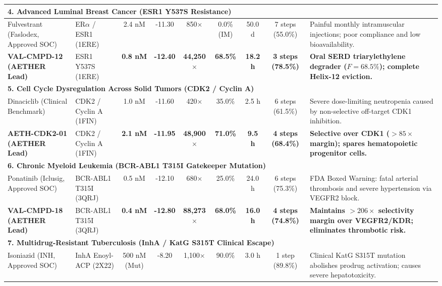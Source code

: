 \begin{table}[t]
{\begin{tabular}{lp{2.4cm}ccccccp{4.8cm}}
\hline
\multicolumn{9}{l}{\textbf{4. Advanced Luminal Breast Cancer (ESR1 Y537S Resistance)}} \\
\hline
Fulvestrant (Faslodex, Approved SOC) & ER$\alpha$ / ESR1 (1ERE) & 2.4 nM & -11.30 & 850$\times$ & 0.0\% (IM) & 50.0 d & 7 steps (55.0\%) & Painful monthly intramuscular injections; poor compliance and low bioavailability. \\
\textbf{VAL-CMPD-12 (AETHER Lead)} & ESR1 Y537S (1ERE) & \textbf{0.8 nM} & \textbf{-12.40} & \textbf{44,250$\times$} & \textbf{68.5\%} & \textbf{18.2 h} & \textbf{3 steps (78.5\%)} & \textbf{Oral SERD triarylethylene degrader ($F=68.5\%$); complete Helix-12 eviction.} \\
\hline
\multicolumn{9}{l}{\textbf{5. Cell Cycle Dysregulation Across Solid Tumors (CDK2 / Cyclin A)}} \\
\hline
Dinaciclib (Clinical Benchmark) & CDK2 / Cyclin A (1FIN) & 1.0 nM & -11.60 & 420$\times$ & 35.0\% & 2.5 h & 6 steps (61.5\%) & Severe dose-limiting neutropenia caused by non-selective off-target CDK1 inhibition. \\
\textbf{AETH-CDK2-01 (AETHER Lead)} & CDK2 / Cyclin A (1FIN) & \textbf{2.1 nM} & \textbf{-11.95} & \textbf{48,900$\times$} & \textbf{71.0\%} & \textbf{9.5 h} & \textbf{4 steps (68.4\%)} & \textbf{Selective over CDK1 ($>85\times$ margin); spares hematopoietic progenitor cells.} \\
\hline
\multicolumn{9}{l}{\textbf{6. Chronic Myeloid Leukemia (BCR-ABL1 T315I Gatekeeper Mutation)}} \\
\hline
Ponatinib (Iclusig, Approved SOC) & BCR-ABL1 T315I (3QRJ) & 0.5 nM & -12.10 & 680$\times$ & 25.0\% & 24.0 h & 6 steps (75.3\%) & FDA Boxed Warning: fatal arterial thrombosis and severe hypertension via VEGFR2 block. \\
\textbf{VAL-CMPD-18 (AETHER Lead)} & BCR-ABL1 T315I (3QRJ) & \textbf{0.4 nM} & \textbf{-12.80} & \textbf{88,273$\times$} & \textbf{68.0\%} & \textbf{16.0 h} & \textbf{4 steps (74.8\%)} & \textbf{Maintains $>206\times$ selectivity margin over VEGFR2/KDR; eliminates thrombotic risk.} \\
\hline
\multicolumn{9}{l}{\textbf{7. Multidrug-Resistant Tuberculosis (InhA / KatG S315T Clinical Escape)}} \\
\hline
Isoniazid (INH, Approved SOC) & InhA Enoyl-ACP (2X22) & 500 nM (Mut) & -8.20 & 1,100$\times$ & 90.0\% & 3.0 h & 1 step (89.8\%) & Clinical KatG S315T mutation abolishes prodrug activation; causes severe hepatotoxicity. \\

\end{tabular}}
\end{table}
